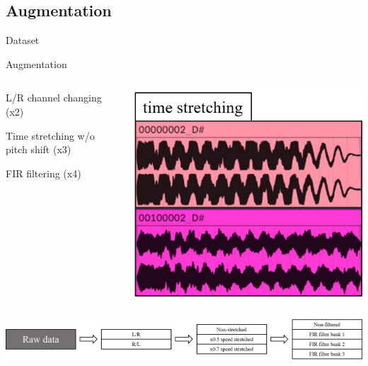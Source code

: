 \subsection{Augmentation}
\begin{frame}{Dataset}
    \begin{block}{Augmentation}
            \begin{itemize}
            \begin{columns}
            \begin{column}{.4\textwidth}
            \item L/R channel changing (x2)
            \item Time stretching w/o pitch shift (x3)
            \item FIR filtering (x4)
            \end{column}
            \begin{column}{.3\textwidth}
            \centering
            \includegraphics[width=1\linewidth]{Presentation/figures/augmentation1.png}
            \end{column}
            \end{columns}
        \end{itemize}
    \end{block}
        \begin{minipage}{.5\textwidth}
        \bigskip
        \bigskip
        \centering
        \includegraphics[width=2\linewidth]{Presentation/figures/augmentation2.png}
    \end{minipage}
\end{frame}


